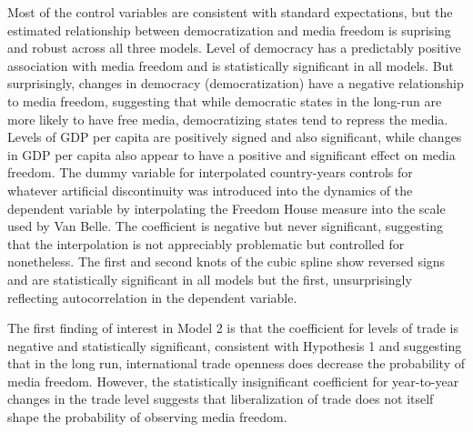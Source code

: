 \documentclass[12pt,a4paper]{article}\usepackage[]{graphicx}\usepackage[]{color}
\begin{document}
Most of the control variables are consistent with standard expectations, but the estimated relationship between democratization and media freedom is suprising and robust across all three models. Level of democracy has a predictably positive association with media freedom and is statistically significant in all models. But surprisingly, changes in democracy (democratization) have a negative relationship to media freedom, suggesting that while democratic states in the long-run are more likely to have free media, democratizing states tend to repress the media. Levels of GDP per capita are positively signed and also significant, while changes in GDP per capita also appear to have a positive and significant effect on media freedom. The dummy variable for interpolated country-years controls for whatever artificial discontinuity was introduced into the dynamics of the dependent variable by interpolating the Freedom House measure into the scale used by Van Belle. The coefficient is negative but never significant, suggesting that the interpolation is not appreciably problematic but controlled for nonetheless. The first and second knots of the cubic spline show reversed signs and are statistically significant in all models but the first, unsurprisingly reflecting autocorrelation in the dependent variable.

The first finding of interest in Model 2 is that the coefficient for levels of trade is negative and statistically significant, consistent with Hypothesis 1 and suggesting that in the long run, international trade openness does decrease the probability of media freedom. However, the statistically insignificant coefficient for year-to-year changes in the trade level suggests that liberalization of trade does not itself shape the probability of observing media freedom.
\end{document}
